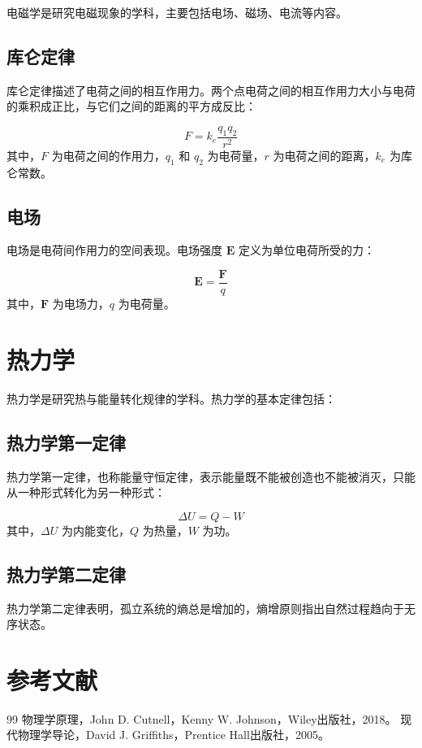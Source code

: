\documentclass[a4paper,12pt]{article}
\begin{document}
电磁学是研究电磁现象的学科，主要包括电场、磁场、电流等内容。


\subsection{库仑定律}

库仑定律描述了电荷之间的相互作用力。两个点电荷之间的相互作用力大小与电荷的乘积成正比，与它们之间的距离的平方成反比：


\begin{equation}
    F = k_e \frac{q_1 q_2}{r^2}
\end{equation}
其中，$F$ 为电荷之间的作用力，$q_1$ 和 $q_2$ 为电荷量，$r$ 为电荷之间的距离，$k_e$ 为库仑常数。

\subsection{电场}

电场是电荷间作用力的空间表现。电场强度 $\mathbf{E}$ 定义为单位电荷所受的力：

\begin{equation}
    \mathbf{E} = \frac{\mathbf{F}}{q}
\end{equation}
其中，$\mathbf{F}$ 为电场力，$q$ 为电荷量。

\newpage

\section{热力学}

热力学是研究热与能量转化规律的学科。热力学的基本定律包括：

\subsection{热力学第一定律}

热力学第一定律，也称能量守恒定律，表示能量既不能被创造也不能被消灭，只能从一种形式转化为另一种形式：

\begin{equation}
    \Delta U = Q - W
\end{equation}
其中，$\Delta U$ 为内能变化，$Q$ 为热量，$W$ 为功。

\subsection{热力学第二定律}

热力学第二定律表明，孤立系统的熵总是增加的，熵增原则指出自然过程趋向于无序状态。

\newpage

\section{参考文献}

\begin{thebibliography}{99}
     物理学原理，John D. Cutnell，Kenny W. Johnson，Wiley出版社，2018。
     现代物理学导论，David J. Griffiths，Prentice Hall出版社，2005。
\end{thebibliography}
\end{document}
